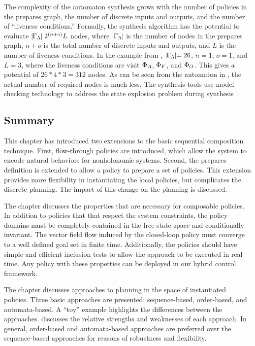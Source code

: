  The complexity of the automaton synthesis grows with the number of
 policies in the prepares graph, the number of discrete inputs and
 outputs, and the number of ``liveness conditions.''  Formally, the
 synthesis algorithm has the potential to evaluate $\mid\!\!\Gamma_{\Lambda}\!\!
 \mid 2^{\left( n+o \right)} L$ nodes, where $\mid\!\!\Gamma_{\Lambda}\!\!\mid$ is the number
 of nodes in the prepares graph, $n+o$ is the total number of discrete
 inputs and outputs, and $L$ is the number of liveness conditions.  In
 the example from , $\mid\!\!\Gamma_{\Lambda}\!\!\mid =
 26$, $n = 1$, $o=1$, and $L = 3$, where the liveness conditions are
 visit $\Phi_A$, $\Phi_F$, and $\Phi_O$.  This gives a potential of
 $26*4*3=312$ nodes.  As can be seen from the automaton in
 , the actual number of required nodes is
 much less.  The synthesis tools use model checking technology to
 address the state explosion problem during
 synthesis~\cite{hadas_07,piterman_06}.



\subsection{Summary}
\label{sec:approach_summary}

This chapter has introduced two extensions to the basic sequential composition
technique.  First, flow-through policies are introduced, which allow the system to
encode natural behaviors for nonholonomic systems.  Second, the prepares definition
is extended to allow a policy to prepare a set of policies.  This extension provides
more flexibility in instantiating the local policies, but complicates the discrete
planning.  The impact of this change on the planning is discussed.

The chapter discusses the properties that are necessary for composable policies.  In
addition to policies that that respect the system constraints, the policy domains
must be completely contained in the free state space and conditionally invariant.
The vector field flow induced by the closed-loop policy must converge to a well
defined goal set in finite time.  Additionally, the policies should have simple and
efficient inclusion tests to allow the approach to be executed in real time.  Any
policy with these properties can be deployed in our hybrid control framework.

The chapter discusses approaches to planning in the space of instantiated policies.
Three basic approaches are presented: sequence-based, order-based, and
automata-based.  A ``toy'' example highlights the differences between the approaches.
 discusses the relative strengths and weaknesses of each approach.
In general, order-based and automata-based approaches are preferred over the
sequence-based approaches for reasons of robustness and flexibility.

